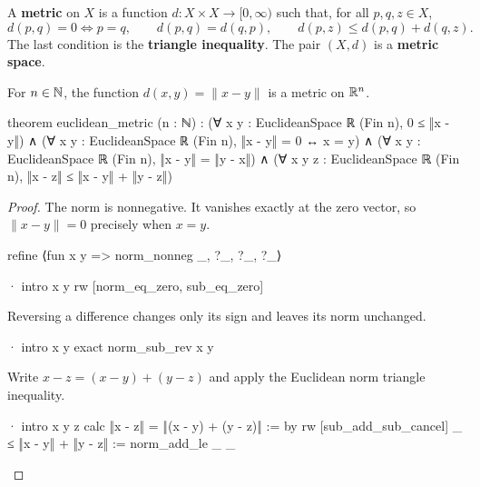 \begin{definition}
  \label{an1:def:metric-space}
  A \textbf{metric} on $X$ is a function $d:X\times X\to[0,\infty)$ such that, for all $p,q,z\in
    X$,
  \[
    d(p,q)=0\iff p=q,\qquad d(p,q)=d(q,p),\qquad d(p,z)\leq d(p,q)+d(q,z).
  \]
  The last condition is the \textbf{triangle inequality}.
  The pair $(X,d)$ is a \textbf{metric space}.
\end{definition}

\begin{proposition}
  \label{an1:thm:standard-metric-on-Rn}
  For $n\in\mathbb{N}$, the function $d(x,y)=\|x-y\|$ is a metric on $\mathbb{R}^{n}$.

  \begin{lean}
    theorem euclidean_metric (n : ℕ) :
        (∀ x y : EuclideanSpace ℝ (Fin n), 0 ≤ ‖x - y‖) ∧
        (∀ x y : EuclideanSpace ℝ (Fin n), ‖x - y‖ = 0 ↔ x = y) ∧
        (∀ x y : EuclideanSpace ℝ (Fin n), ‖x - y‖ = ‖y - x‖) ∧
        (∀ x y z : EuclideanSpace ℝ (Fin n),
          ‖x - z‖ ≤ ‖x - y‖ + ‖y - z‖)
  \end{lean}
\end{proposition}

\begin{proof}
  The norm is nonnegative.
  It vanishes exactly at the zero vector, so $\|x-y\|=0$ precisely when $x=y$.

  \begin{lean}
    refine ⟨fun x y => norm_nonneg _, ?_, ?_, ?_⟩

    · intro x y
      rw [norm_eq_zero, sub_eq_zero]
  \end{lean}

  Reversing a difference changes only its sign and leaves its norm unchanged.

  \begin{lean}
    · intro x y
      exact norm_sub_rev x y
  \end{lean}

  Write $x-z=(x-y)+(y-z)$ and apply the Euclidean norm triangle inequality.

  \begin{lean}
    · intro x y z
      calc
        ‖x - z‖ = ‖(x - y) + (y - z)‖ := by
          rw [sub_add_sub_cancel]
        _ ≤ ‖x - y‖ + ‖y - z‖ := norm_add_le _ _
  \end{lean}

\end{proof}

